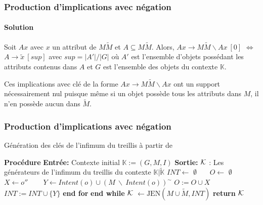 \documentclass[french]{beamer}
\def\KK{\mathbb{K}}
\def\KKc{\mathbb{K}|\tilde{\mathbb{K}}}
\begin{document}
\begin{frame}
\frametitle{Production d'implications avec négation}
\framesubtitle{Solution}
 \begin{theorem}
Soit $Ax$ avec $x$ un attribut de $M\tilde{M}$ et $A \subseteq M\tilde{M}$. Alors, $Ax \rightarrow
M\tilde{M}\backslash Ax~[0]$
   $\Leftrightarrow$ $A \rightarrow \tilde{x}~[sup]$ avec $sup=|A'| / |G|$ où $A'$ est l'ensemble d'objets possédant les attributs contenus dans $A$ et $G$ est l'ensemble des objets du contexte $\KK$.
 \label{axiom1}
\end{theorem}
Ces implications avec clé de la forme $Ax \rightarrow
M\tilde{M}\backslash Ax$ ont un support nécessairement nul puisque même si un objet possède tous les attributs dans $M$, il n'en possède aucun dans $\tilde{M}$.
\end{frame}
\begin{frame}
\frametitle{Production d'implications avec négation}
\begin{algorithm}[H]
\caption{Génération des clés de l'infimum du treillis à partir de \context}
\begin{algorithmic}[1]
\STATE \textbf{Procédure}
\STATE \textbf{Entrée:} Contexte initial $\KK:= (G,M,I)$
\STATE \textbf{Sortie:} $\cal{K}$ : Les générateurs de l'infimum du treillis du contexte $\KKc$
\STATE $INT \gets$ $\emptyset$~~~
\STATE $O \gets$ $\emptyset$~~~
    \STATE $X \gets o''$ ~~~
    \STATE $Y \gets Intent(o) \cup (M\ \backslash\ Intent(o))^{\sim}$
    \STATE $O := O \cup X$
    \STATE $INT := INT \cup \{Y\}$
  \ENDFOR \STATE \textbf{end for}
\ENDWHILE \STATE \textbf{end while}
\STATE $\cal{K}$ $\gets \text{JEN}(M \cup \tilde{M}, INT)$
\STATE \textbf{return} $\cal{K}$
\end{algorithmic}
\end{algorithm}
\end{frame}
\end{document}
